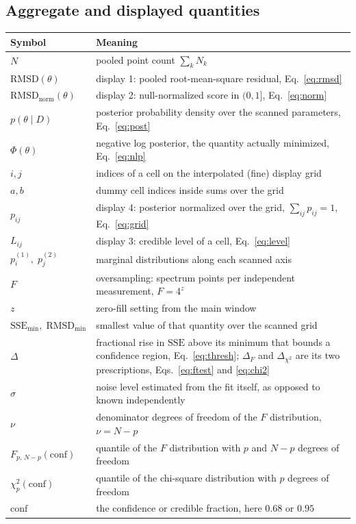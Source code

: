 \documentclass[11pt,a4paper]{article}
\newcommand{\SSE}{\mathrm{SSE}}
\newcommand{\RMSD}{\mathrm{RMSD}}
\begin{document}
\subsection*{Aggregate and displayed quantities}

\begin{tabular}{@{}l p{12.6cm}@{}}
\hline
Symbol & Meaning \\
\hline
$N$ & pooled point count $\sum_k N_k$ \\
$\RMSD(\theta)$ & display 1: pooled root-mean-square residual, Eq.\ \eqref{eq:rmsd} \\
$\RMSD_{\text{norm}}(\theta)$ & display 2: null-normalized score in $(0,1]$, Eq.\ \eqref{eq:norm} \\
$p(\theta\mid D)$ & posterior probability density over the scanned parameters, Eq.\ \eqref{eq:post} \\
$\Phi(\theta)$ & negative log posterior, the quantity actually minimized, Eq.\ \eqref{eq:nlp} \\
$i,j$ & indices of a cell on the interpolated (fine) display grid \\
$a,b$ & dummy cell indices inside sums over the grid \\
$p_{ij}$ & display 4: posterior normalized over the grid, $\sum_{ij}p_{ij}=1$, Eq.\ \eqref{eq:grid} \\
$L_{ij}$ & display 3: credible level of a cell, Eq.\ \eqref{eq:level} \\
$p^{(1)}_i,\;p^{(2)}_j$ & marginal distributions along each scanned axis \\
$F$ & oversampling: spectrum points per independent measurement, $F=4^{z}$ \\
$z$ & zero-fill setting from the main window \\
$\SSE_{\min},\;\RMSD_{\min}$ & smallest value of that quantity over the scanned grid \\
$\Delta$ & fractional rise in $\SSE$ above its minimum that bounds a confidence region, Eq.\ \eqref{eq:thresh}; $\Delta_F$ and $\Delta_{\chi^2}$ are its two prescriptions, Eqs.\ \eqref{eq:ftest} and \eqref{eq:chi2} \\
$\hat{\sigma}$ & noise level estimated from the fit itself, as opposed to known independently \\
$\nu$ & denominator degrees of freedom of the $F$ distribution, $\nu=N-p$ \\
$F_{p,\,N-p}(\text{conf})$ & quantile of the $F$ distribution with $p$ and $N-p$ degrees of freedom \\
$\chi^2_p(\text{conf})$ & quantile of the chi-square distribution with $p$ degrees of freedom \\
$\text{conf}$ & the confidence or credible fraction, here $0.68$ or $0.95$ \\
\hline
\end{tabular}
\end{document}
